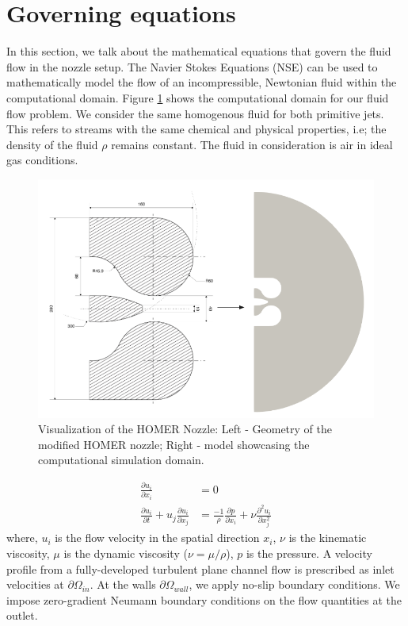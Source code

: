 \section{Governing equations} \label{goveq}
In this section, we talk about the mathematical equations that govern the fluid flow in the nozzle setup. The Navier Stokes Equations (NSE) can be used to mathematically model the flow of an incompressible, Newtonian fluid within the computational domain. Figure \ref{fig:Domain} shows the computational domain for our fluid flow problem. We consider the same homogenous fluid for both primitive jets. This refers to streams with the same chemical and physical properties, i.e; the density of the fluid $\rho$ remains constant. The fluid in consideration is air in ideal gas conditions. 
\begin{figure}[ht]
  \centering
  \includegraphics[width=12cm]{images/Theory-CFD/Flow Domain.png}
  \caption{Visualization of the HOMER Nozzle: Left - Geometry of the modified HOMER nozzle; Right -  model showcasing the computational simulation domain.}
  \label{fig:Domain}
\end{figure}
\begin{equation}
  \begin{aligned}
  \frac{\partial u_i}{\partial x_i}&=0\\
  \frac{\partial u_i}{\partial t}+u_j \frac{\partial u_i}{\partial x_j}&=\frac{-1}{\rho} \frac{\partial p}{\partial x_i}+\nu \frac{\partial^2 u_i}{\partial x_j^2}
  \end{aligned}
  \end{equation}
where, $u_i$ is the flow velocity in the spatial direction $x_i$, $\nu$ is the kinematic viscosity, $\mu$ is the dynamic viscosity ($\nu = \mu / \rho$), $p$ is the pressure. A velocity profile from a fully-developed turbulent plane channel flow is prescribed as inlet velocities at $\partial{\Omega_{in}}$. At the walls $\partial{\Omega_{wall}}$, we apply no-slip boundary conditions. We impose zero-gradient Neumann boundary conditions on the flow quantities at the outlet.\\
